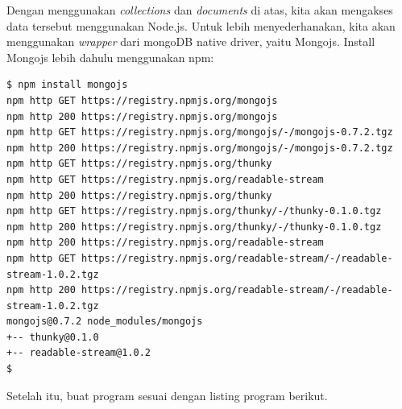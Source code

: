 Dengan menggunakan \textit{collections} dan \textit{documents} di atas, kita akan mengakses data tersebut menggunakan Node.js. Untuk lebih menyederhanakan, kita akan menggunakan \textit{wrapper} dari mongoDB native driver, yaitu Mongojs. Install Mongojs lebih dahulu menggunakan npm:

\lstset{language=bash,caption=Instalasi driver mongoDB}
\begin{lstlisting}
$ npm install mongojs
npm http GET https://registry.npmjs.org/mongojs
npm http 200 https://registry.npmjs.org/mongojs
npm http GET https://registry.npmjs.org/mongojs/-/mongojs-0.7.2.tgz
npm http 200 https://registry.npmjs.org/mongojs/-/mongojs-0.7.2.tgz
npm http GET https://registry.npmjs.org/thunky
npm http GET https://registry.npmjs.org/readable-stream
npm http 200 https://registry.npmjs.org/thunky
npm http GET https://registry.npmjs.org/thunky/-/thunky-0.1.0.tgz
npm http 200 https://registry.npmjs.org/thunky/-/thunky-0.1.0.tgz
npm http 200 https://registry.npmjs.org/readable-stream
npm http GET https://registry.npmjs.org/readable-stream/-/readable-stream-1.0.2.tgz
npm http 200 https://registry.npmjs.org/readable-stream/-/readable-stream-1.0.2.tgz
mongojs@0.7.2 node_modules/mongojs
+-- thunky@0.1.0
+-- readable-stream@1.0.2
$
\end{lstlisting}

Setelah itu, buat program sesuai dengan listing program berikut.

